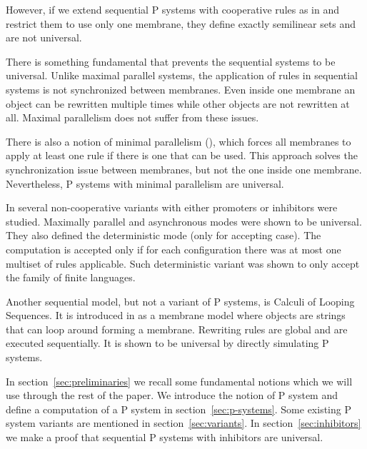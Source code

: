 \documentclass[llncs,submission,copyright,creativecommons]{../lib/lncs/llncs}
\begin{document}

However, if we extend sequential P systems with cooperative rules as in \cite{Dang04onp} and restrict them to use only one membrane, they define exactly semilinear sets and are not universal.

There is something fundamental that prevents the sequential systems to be universal. Unlike maximal parallel systems, the application of rules in sequential systems is not synchronized between membranes. Even inside one membrane an object can be rewritten multiple times while other objects are not rewritten at all.
Maximal parallelism does not suffer from these issues.

There is also a notion of minimal parallelism (\cite{Ciobanu:2007:PSM:1243519.1243811}), which forces all membranes to apply at least one rule if there is one that can be used. This approach solves the synchronization issue between membranes, but not the one inside one membrane. Nevertheless, P systems with minimal parallelism are universal.




In \cite{Alhazov13} several non-cooperative variants with either promoters or inhibitors were studied. Maximally parallel and asynchronous modes were shown to be universal. They also defined the deterministic mode (only for accepting case). The computation is accepted only if for each configuration there was at most one multiset of rules applicable. Such deterministic variant was shown to only accept the family of finite languages.


Another sequential model, but not a variant of P systems, is Calculi of Looping Sequences. It is introduced in \cite{Barbuti07thecalculus} as a membrane model where objects are strings that can loop around forming a membrane. Rewriting rules are global and are executed sequentially. It is shown to be universal by directly simulating P systems.


In section~\ref{sec:preliminaries} we recall some fundamental notions which we will use through the rest of the paper.
We introduce the notion of P system and define a computation of a P system in section~\ref{sec:p-systems}.
Some existing P system variants are mentioned in section~\ref{sec:variants}.
In section~\ref{sec:inhibitors} we make a proof that sequential P systems with inhibitors are universal.
\end{document}

